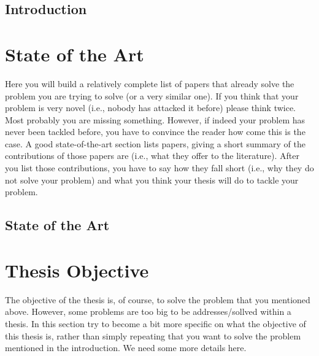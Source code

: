 \documentclass[a4paper]{article}
\begin{document}
\subsection{Introduction}













\section{State of the Art}
Here you will build a relatively complete list of papers that already solve the problem you are trying to solve (or a very similar one). If you think that your problem is very novel (i.e., nobody has attacked it before) please think twice. Most probably you are missing something. However, if indeed your problem has never been tackled before, you have to convince the reader how come this is the case. A good state-of-the-art section lists papers, giving a short summary of the contributions of those papers are (i.e., what they offer to the literature). After you list those contributions, you have to say how they fall short (i.e., why they do not solve your problem) and what you think your thesis will do to tackle your problem.

\subsection{State of the Art}


\section{Thesis Objective}
The objective of the thesis is, of course, to solve the problem that you mentioned above. However, some problems are too big to be addresses/sollved within a thesis. In this section try to become a bit more specific on what the objective of this thesis is, rather than simply repeating that you want to solve the problem mentioned in the introduction. We need some more details here.
\end{document}
